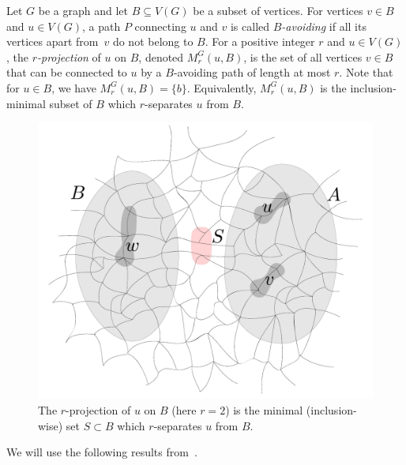 Let $G$ be a graph and let $B\subseteq V(G)$ be a subset of vertices. For vertices $v\in B$ and $u\in V(G)$, a path $P$ connecting $u$ and $v$ is called {\em{$B$-avoiding}}
if all its vertices apart from~$v$ do not belong to $B$. For a positive integer $r$ and $u\in V(G)$, the {\em{$r$-projection}} of $u$ on $B$, denoted $M^G_r(u,B)$, is the set of all vertices $v\in B$ that
can be connected to $u$ by a $B$-avoiding path of length at most $r$. Note that for $u\in B$, we have $M^G_r(u,B)=\{b\}$.
Equivalently, $M^G_r(u,B)$ is the inclusion-minimal
subset of $B$ which $r$-separates $u$ from $B$.

%
%
\begin{figure}[h!]
	\centering
		\includegraphics[scale=0.35,page=2]{pics}
	\caption{The  $r$-projection of $u$ on $B$
	(here $r=2$)
	is the minimal (inclusion-wise) set  $S\subset B$
	which $r$-separates $ u$ from $B$.
	}
	\label{fig:gaifman}
\end{figure}

We will use the following results from~\cite{drange2016kernelization,eickmeyer2016neighborhood}.


